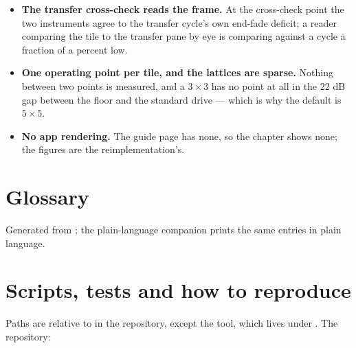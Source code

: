 \documentclass[11pt,a4paper]{article}
\begin{document}
{\begin{itemize}
  quiet-side 7-point lattices until 2026-09-27; both were valid, and the
  value-matched Compare pairs what they share. The tie is broken toward
  the quiet side now, so a 7-point matrix captured before the change
  shares five of its seven levels with one captured after on the same
  rig --- the picture is the same at those five, and the pane says how
  many tiles line up.
  \item \textbf{The transfer cross-check reads the frame.} At the
  cross-check point the two instruments agree to the transfer cycle's
  own end-fade deficit; a reader comparing the tile to the transfer pane
  by eye is comparing against a cycle a fraction of a percent low.
  \item \textbf{One operating point per tile, and the lattices are
  sparse.} Nothing between two points is measured, and a $3\times3$ has no
  point at all in the 22 dB gap between the floor and the standard drive
  --- which is why the default is $5\times5$.
  \item \textbf{No app rendering.} The guide page has none, so the
  chapter shows none; the figures are the reimplementation's.
\end{itemize}
\par}

\clearpage
\section{Glossary}
\label{sec:glossary}
Generated from ; the plain-language companion
prints the same entries in plain language.


\clearpage
\appendix
\section{Scripts, tests and how to reproduce}
Paths are relative to  in the repository, except the
tool, which lives under . The repository: \repo
\end{document}
